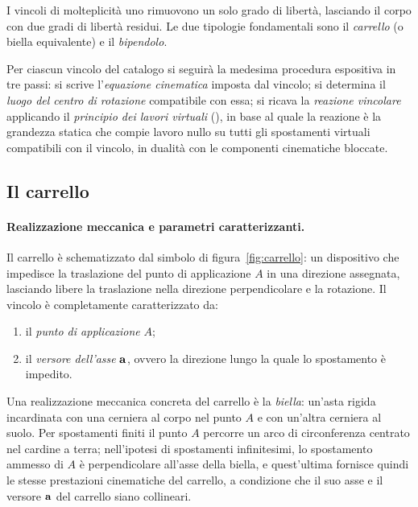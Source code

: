 I vincoli di molteplicità uno rimuovono un solo grado di libertà,
lasciando il corpo con due gradi di libertà residui. Le due tipologie
fondamentali sono il \emph{carrello} (o biella equivalente) e il
\emph{bipendolo}.

Per ciascun vincolo del catalogo si seguirà la medesima procedura
espositiva in tre passi: si scrive l'\emph{equazione cinematica}
imposta dal vincolo; si determina il \emph{luogo del centro di
	rotazione} compatibile con essa; si ricava la \emph{reazione
	vincolare} applicando il \emph{principio dei lavori virtuali}
(), in base al quale la reazione è la
grandezza statica che compie lavoro nullo su tutti gli spostamenti
virtuali compatibili con il vincolo, in dualità con le componenti
cinematiche bloccate.


\subsection{Il carrello}\label{sec:carrello}

\paragraph{Realizzazione meccanica e parametri caratterizzanti.}
Il carrello è schematizzato dal simbolo di figura~\ref{fig:carrello}:
un dispositivo che impedisce la traslazione del punto di applicazione
$A$ in una direzione assegnata, lasciando libere la traslazione
nella direzione perpendicolare e la rotazione. Il vincolo è
completamente caratterizzato da:
\begin{enumerate}[label=(\roman*)]
	\item il \emph{punto di applicazione} $A$;
	\item il \emph{versore dell'asse} $\mathbf{a}$, ovvero la direzione
	lungo la quale lo spostamento è impedito.
\end{enumerate}
Una realizzazione meccanica concreta del carrello è la
\emph{biella}: un'asta rigida incardinata
con una cerniera al corpo nel punto $A$ e con un'altra cerniera
al suolo. Per spostamenti finiti il punto $A$ percorre un arco
di circonferenza centrato nel cardine a terra; nell'ipotesi di
spostamenti infinitesimi, lo spostamento ammesso di $A$ è
perpendicolare all'asse della biella, e quest'ultima fornisce
quindi le stesse prestazioni cinematiche del carrello, a
condizione che il suo asse e il versore $\mathbf{a}$ del carrello
siano collineari.


